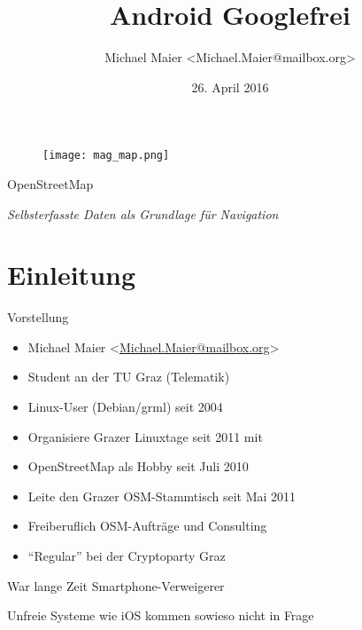 \documentclass{beamer}
\title{Android Googlefrei}
\author{Michael Maier \textless Michael.Maier@mailbox.org\textgreater}
\date{26. April 2016}
\begin{document}

\begin{frame} 


\begin{figure}
  \centering
  \texttt{[image: mag\_map.png]}
\end{figure}

\begin{center}
\Huge{OpenStreetMap\\}
\end{center}

\begin{center}
\Large{\emph{Selbsterfasste Daten als Grundlage für Navigation}}
\end{center}

\end{frame}


\section{Einleitung}


\begin{frame}{Vorstellung}

  \begin{itemize}
    \item Michael Maier \textless \href{mailto:Michael.Maier@mailbox.org}{Michael.Maier@mailbox.org}\textgreater
    \item Student an der TU Graz (Telematik)
\vspace{0.3cm}
    \item Linux-User (Debian/grml) seit 2004
    \item Organisiere Grazer Linuxtage seit 2011 mit
    \item OpenStreetMap als Hobby seit Juli 2010
    \item Leite den Grazer OSM-Stammtisch seit Mai 2011
\vspace{0.3cm}
    \item Freiberuflich OSM-Aufträge und Consulting
    \item "`Regular"' bei der Cryptoparty Graz
  \end{itemize}
\end{frame}

War lange Zeit Smartphone-Verweigerer

Unfreie Systeme wie iOS kommen sowieso nicht in Frage
\end{document}
